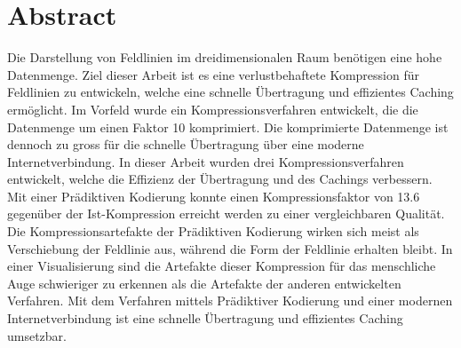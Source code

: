 \section*{Abstract}
Die Darstellung von Feldlinien im dreidimensionalen Raum benötigen eine hohe Datenmenge. Ziel dieser Arbeit ist es eine verlustbehaftete Kompression für Feldlinien zu entwickeln, welche eine schnelle Übertragung und effizientes Caching ermöglicht. Im Vorfeld wurde ein Kompressionsverfahren entwickelt, die die Datenmenge um einen Faktor 10 komprimiert. Die komprimierte Datenmenge ist dennoch zu gross für die schnelle Übertragung über eine moderne Internetverbindung. In dieser Arbeit wurden drei Kompressionsverfahren entwickelt, welche die Effizienz der Übertragung und des Cachings verbessern. Mit einer Prädiktiven Kodierung konnte einen Kompressionsfaktor von 13.6  gegenüber der Ist-Kompression erreicht werden zu einer vergleichbaren Qualität. Die Kompressionsartefakte der Prädiktiven Kodierung wirken sich meist als Verschiebung der Feldlinie aus, während die Form der Feldlinie erhalten bleibt. In einer Visualisierung sind die Artefakte dieser Kompression für das menschliche Auge schwieriger zu erkennen als die Artefakte der anderen entwickelten Verfahren. Mit dem Verfahren mittels Prädiktiver Kodierung und einer modernen Internetverbindung ist eine schnelle Übertragung und effizientes Caching umsetzbar.